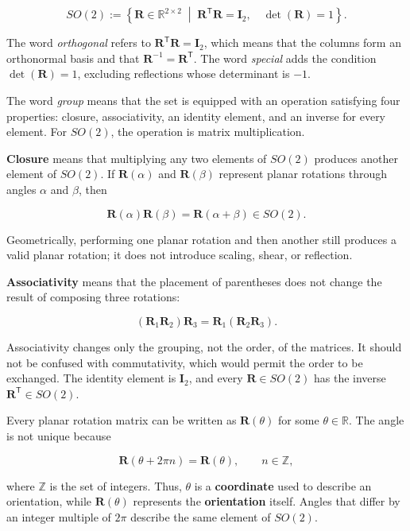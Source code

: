 \documentclass[
  australian,
  12pt,
  letterpaper,
  DIV=11,
  numbers=noendperiod,
  twoside]{scrreprt}
\begin{document}
\[
SO(2)
\mathrel{:=}
\left\{
\mathbf R\in\mathbb R^{2\times2}
\;\middle|\;
\mathbf R^\mathsf T\mathbf R=\mathbf I_2,
\quad
\det(\mathbf R)=1
\right\}.
\]

The word \emph{orthogonal} refers to
\(\mathbf R^\mathsf T\mathbf R=\mathbf I_2\), which means that the
columns form an orthonormal basis and that
\(\mathbf R^{-1}=\mathbf R^\mathsf T\). The word \emph{special} adds the
condition \(\det(\mathbf R)=1\), excluding reflections whose determinant
is \(-1\).

The word \emph{group} means that the set is equipped with an operation
satisfying four properties: closure, associativity, an identity element,
and an inverse for every element. For \(SO(2)\), the operation is matrix
multiplication.

\textbf{Closure} means that multiplying any two elements of \(SO(2)\)
produces another element of \(SO(2)\). If \(\mathbf R(\alpha)\) and
\(\mathbf R(\beta)\) represent planar rotations through angles
\(\alpha\) and \(\beta\), then

\[
\mathbf R(\alpha)\mathbf R(\beta)
=
\mathbf R(\alpha+\beta)
\in SO(2).
\]

Geometrically, performing one planar rotation and then another still
produces a valid planar rotation; it does not introduce scaling, shear,
or reflection.

\textbf{Associativity} means that the placement of parentheses does not
change the result of composing three rotations:

\[
\left(\mathbf R_1\mathbf R_2\right)\mathbf R_3
=
\mathbf R_1\left(\mathbf R_2\mathbf R_3\right).
\]

Associativity changes only the grouping, not the order, of the matrices.
It should not be confused with commutativity, which would permit the
order to be exchanged. The identity element is \(\mathbf I_2\), and
every \(\mathbf R\in SO(2)\) has the inverse
\(\mathbf R^\mathsf T\in SO(2)\).

Every planar rotation matrix can be written as \(\mathbf R(\theta)\) for
some \(\theta\in\mathbb R\). The angle is not unique because

\[
\mathbf R(\theta+2\pi n)=\mathbf R(\theta),
\qquad n\in\mathbb Z,
\]

where \(\mathbb Z\) is the set of integers. Thus, \(\theta\) is a
\textbf{coordinate} used to describe an orientation, while
\(\mathbf R(\theta)\) represents the \textbf{orientation} itself. Angles
that differ by an integer multiple of \(2\pi\) describe the same element
of \(SO(2)\).
\end{document}

